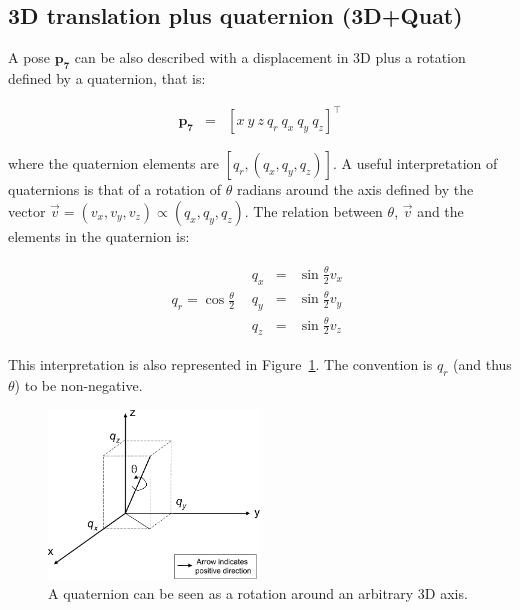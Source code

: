 \documentclass[a4paper,11pt]{report}
\begin{document}

\subsection{3D translation plus quaternion (3D+Quat)}

A pose $\mathbf{p_7}$ can be also described with a displacement in 3D plus a rotation
defined by a quaternion, that is:

\begin{eqnarray}
\mathbf{p_7} &=& [x ~ y ~ z ~  q_r ~ q_x ~ q_y ~ q_z ] ^ \top
\end{eqnarray}

\noindent where the quaternion elements are $[q_r, (q_x,q_y,q_z)]$. A useful interpretation of quaternions
is that of a rotation of $\theta$ radians around the axis defined by the vector $\vec{v} = (v_x,v_y,v_z) \propto (q_x,q_y,q_z)$.
The relation between $\theta$, $\vec{v}$ and the elements in the quaternion is:

\begin{equation*}
\begin{array}{cc}
q_r = \cos\frac{\theta}{2}  &
  \begin{array}{rcl}
    q_x &=& \sin\frac{\theta}{2} v_x  \\
    q_y &=& \sin\frac{\theta}{2} v_y  \\
    q_z &=& \sin\frac{\theta}{2} v_z
  \end{array}
\end{array}
\end{equation*}

This interpretation is also represented in Figure~\ref{fig:quat}.
The convention is $q_r$ (and thus $\theta$) to be non-negative.


\begin{figure}[h]
\centering
\includegraphics[width=0.50\textwidth]{imgs/quaternion.pdf}
\caption{A quaternion can be seen as a rotation around an arbitrary 3D axis.}
\label{fig:quat}
\end{figure}
\end{document}
